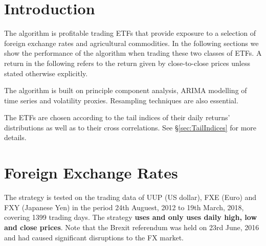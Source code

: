 \documentclass[12pt]{article}
\begin{document}
\maketitle

\section{Introduction}
The algorithm is profitable trading ETFs that provide exposure to a
selection of foreign exchange rates and agricultural commodities. In
the following sections we show the performance of the algorithm when
trading these two classes of ETFs. A return in the following refers to
the return given by close-to-close prices unless stated otherwise
explicitly.

The algorithm is built on principle component analysis, ARIMA
modelling of time series and volatility proxies. Resampling techniques
are also essential.

The ETFs are chosen according to the tail indices of their daily
returns' distributions as well as to their cross correlations. See
\S\ref{sec:TailIndices} for more details.

\section{Foreign Exchange Rates}
The strategy is tested on the trading data of UUP (US dollar), FXE
(Euro) and FXY (Japanese Yen) in the period 24th Auguest, 2012 to 19th
March, 2018, covering 1399 trading days. The strategy {\bf uses and
  only uses daily high, low and close prices}. Note that the Brexit
referendum was held on 23rd June, 2016 and had caused significant
disruptions to the FX market.
\end{document}
